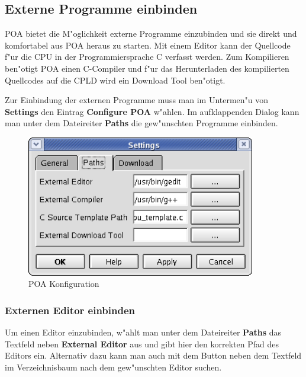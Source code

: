 \documentclass[a4paper,titlepage,12pt,ngerman]{scrbook}
\begin{document}
\subsection{Externe Programme einbinden}
POA bietet die M"oglichkeit externe Programme einzubinden und sie direkt und komfortabel aus POA heraus zu starten. Mit einem Editor kann der Quellcode f"ur die CPU in der Programmiersprache C  verfasst werden. Zum Kompilieren ben"otigt POA einen C-Compiler und f"ur das Herunterladen des kompilierten Quellcodes auf die CPLD wird ein Download Tool ben"otigt.\par
Zur Einbindung der externen Programme muss man im Untermen"u von {\bf Settings} den Eintrag {\bf Configure POA} w"ahlen. Im aufklappenden Dialog kann man unter dem Dateireiter {\bf Paths} die gew"unschten Programme einbinden.

\begin{figure}[htbp]

\begin{center}

\includegraphics[width=10cm]{POAConfiguration2}

\caption{POA Konfiguration}\label{test}

\end{center}

\end{figure}

\subsubsection{Externen Editor einbinden}
Um einen Editor einzubinden, w"ahlt man unter dem Dateireiter {\bf Paths} das Textfeld neben {\bf External Editor} aus und gibt hier den korrekten Pfad des Editors ein. Alternativ dazu kann man auch mit dem Button neben dem Textfeld im Verzeichnisbaum nach dem gew"unschten Editor suchen.\par
\end{document}
